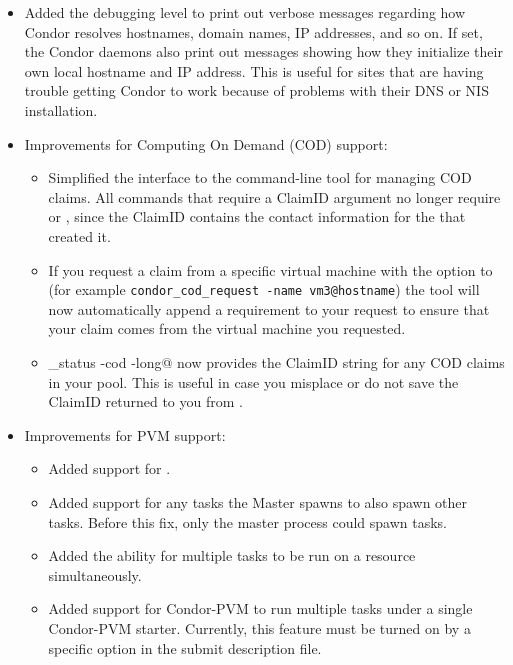 \begin{itemize}
\item Added the  debugging level to print out verbose
  messages regarding how Condor resolves hostnames, domain names,
  IP addresses, and so on.
  If set, the Condor daemons also print out messages showing how they
  initialize their own local hostname and IP address.
  This is useful for sites that are having trouble getting Condor to
  work because of problems with their DNS or NIS installation.

\item Improvements for Computing On Demand (COD) support: 
  \begin{itemize}
    \item Simplified the interface to the  command-line tool
      for managing COD claims.
      All commands that require a ClaimID argument no longer require
       or , since the ClaimID contains the
      contact information for the  that created it. 
    \item If you request a claim from a specific virtual machine with
      the  option to  (for example
      \verb$condor_cod_request -name vm3@hostname$)
      the tool will now automatically append a requirement to your
      request to ensure that your claim comes from the virtual machine
      you requested.
    \item \verb@condor_status -cod -long@ now provides the ClaimID
      string for any COD claims in your pool. 
      This is useful in case you misplace or do not save the ClaimID
      returned to you from .
  \end{itemize}

\item Improvements for PVM support:
  \begin{itemize}
  \item Added support for .
  \item Added support for any tasks the Master spawns to also spawn other
	tasks. Before this fix, only the master process could spawn tasks.
  \item Added the ability for multiple tasks to be run on a resource
	simultaneously. 
  \item Added support for Condor-PVM to run multiple tasks under a single
	Condor-PVM starter. Currently, this feature must be turned on
	by a specific option in the submit description file.
  \end{itemize}


\end{itemize}
